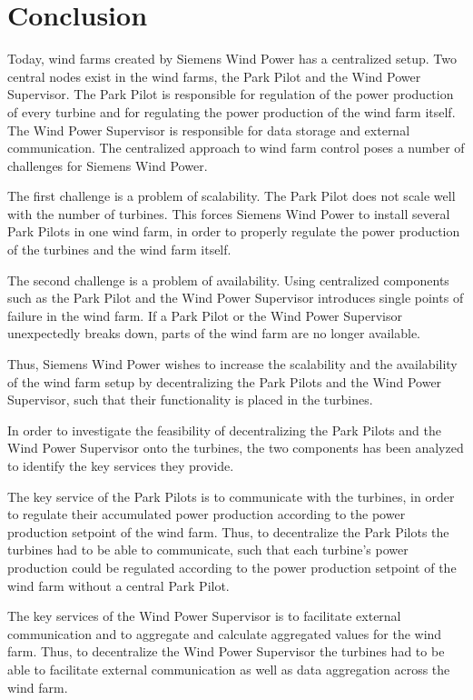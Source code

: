 \chapter{Conclusion}
Today, wind farms created by Siemens Wind Power has a centralized setup. Two central nodes exist in the wind farms, the Park Pilot and the Wind Power Supervisor. The Park Pilot is responsible for regulation of the power production of every turbine and for regulating the power production of the wind farm itself. The Wind Power Supervisor is responsible for data storage and external communication. The centralized approach to wind farm control poses a number of challenges for Siemens Wind Power.

The first challenge is a problem of scalability. The Park Pilot does not scale well with the number of turbines. This forces Siemens Wind Power to install several Park Pilots in one wind farm, in order to properly regulate the power production of the turbines and the wind farm itself.

The second challenge is a problem of availability. Using centralized components such as the Park Pilot and the Wind Power Supervisor introduces single points of failure in the wind farm. If a Park Pilot or the Wind Power Supervisor unexpectedly breaks down, parts of the wind farm are no longer available.

Thus, Siemens Wind Power wishes to increase the scalability and the availability of the wind farm setup by decentralizing the Park Pilots and the Wind Power Supervisor, such that their functionality is placed in the turbines.

In order to investigate the feasibility of decentralizing the Park Pilots and the Wind Power Supervisor onto the turbines, the two components has been analyzed to identify the key services they provide.

The key service of the Park Pilots is to communicate with the turbines, in order to regulate their accumulated power production according to the power production setpoint of the wind farm. Thus, to decentralize the Park Pilots the turbines had to be able to communicate, such that each turbine's power production could be regulated according to the power production setpoint of the wind farm without a central Park Pilot.

The key services of the Wind Power Supervisor is to facilitate external communication and to aggregate and calculate aggregated values for the wind farm. Thus, to decentralize the Wind Power Supervisor the turbines had to be able to facilitate external communication as well as data aggregation across the wind farm.

